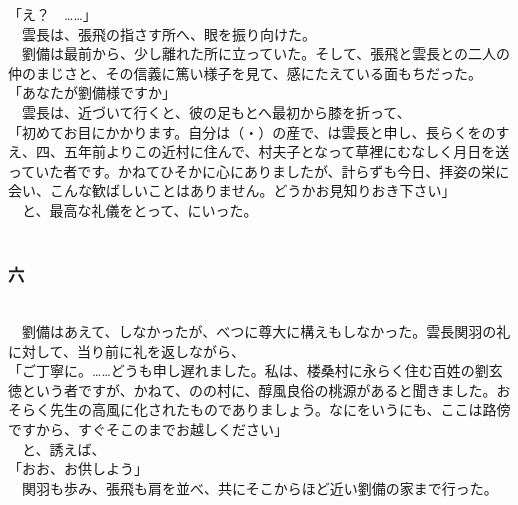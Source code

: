 \documentclass[
  paper=a5,
  fontsize=10pt,
  jafontsize=9.5pt,
  tate,                  %
  open_bracket_pos=nibu, %
]{jlreq}
\begin{document}
「え？　……」\\


　雲長は、張飛の指さす所へ、眼を振り向けた。\\


　劉備は最前から、少し離れた所に立っていた。そして、張飛と雲長との二人の仲のまじさと、その信義に篤い様子を見て、感にたえている面もちだった。\\


「あなたが劉備様ですか」\\


　雲長は、近づいて行くと、彼の足もとへ最初から膝を折って、\\


「初めてお目にかかります。自分は（・）の産で、は雲長と申し、長らくをのすえ、四、五年前よりこの近村に住んで、村夫子となって草裡にむなしく月日を送っていた者です。かねてひそかに心にありましたが、計らずも今日、拝姿の栄に会い、こんな歓ばしいことはありません。どうかお見知りおき下さい」\\


　と、最高な礼儀をとって、にいった。\\

\\

\subsubsection{六}

\\


　劉備はあえて、しなかったが、べつに尊大に構えもしなかった。雲長関羽の礼に対して、当り前に礼を返しながら、\\


「ご丁寧に。……どうも申し遅れました。私は、楼桑村に永らく住む百姓の劉玄徳という者ですが、かねて、のの村に、醇風良俗の桃源があると聞きました。おそらく先生の高風に化されたものでありましょう。なにをいうにも、ここは路傍ですから、すぐそこのまでお越しください」\\


　と、誘えば、\\


「おお、お供しよう」\\


　関羽も歩み、張飛も肩を並べ、共にそこからほど近い劉備の家まで行った。\\
\end{document}
